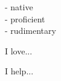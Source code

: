 \documentclass[9pt]{developercv} %
\begin{document}
\begin{minipage}[t]{0.3\textwidth}
	\vspace{-\baselineskip} %

	
	 - native\\
	 - proficient\\
	 - rudimentary
\end{minipage}
\hfill
\begin{minipage}[t]{0.3\textwidth}
	\vspace{-\baselineskip} %
	
	
	I love... \lorem
\end{minipage}
\hfill
\begin{minipage}[t]{0.3\textwidth}
	\vspace{-\baselineskip} %
	
	
	I help... \lorem
\end{minipage}

\end{document}
